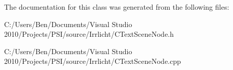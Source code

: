 The documentation for this class was generated from the following files\-:\begin{DoxyCompactItemize}
\item 
C\-:/\-Users/\-Ben/\-Documents/\-Visual Studio 2010/\-Projects/\-P\-S\-I/source/\-Irrlicht/C\-Text\-Scene\-Node.\-h\item 
C\-:/\-Users/\-Ben/\-Documents/\-Visual Studio 2010/\-Projects/\-P\-S\-I/source/\-Irrlicht/C\-Text\-Scene\-Node.\-cpp\end{DoxyCompactItemize}
